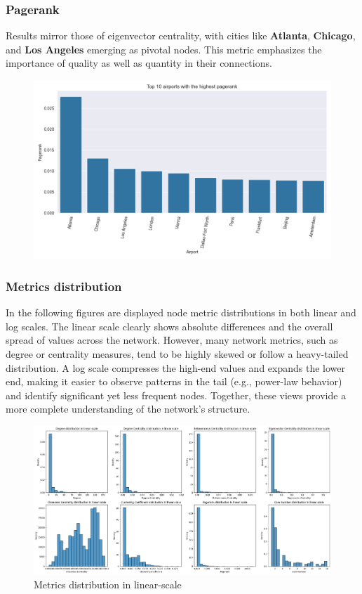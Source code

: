 \documentclass[12pt]{article}
\begin{document}
\subsubsection{Pagerank}
Results mirror those of eigenvector centrality, with cities like \textbf{Atlanta}, \textbf{Chicago}, and \textbf{Los Angeles} emerging as pivotal nodes. This metric emphasizes the importance of quality as well as quantity in their connections.
\begin{figure}[H]
    \centering
    \includegraphics[width=0.8\linewidth]{img/pagerank.png}
\end{figure}

\subsubsection{Metrics distribution}
In the following figures are displayed node metric distributions in both linear and log scales. The linear scale clearly shows absolute differences and the overall spread of values across the network. However, many network metrics, such as degree or centrality measures, tend to be highly skewed or follow a heavy-tailed distribution. A log scale compresses the high-end values and expands the lower end, making it easier to observe patterns in the tail (e.g., power-law behavior) and identify significant yet less frequent nodes. Together, these views provide a more complete understanding of the network's structure.
\begin{figure}[H]
    \centering
    \includegraphics[width=0.8\linewidth]{img/metrics_output.png}
    \caption{Metrics distribution in linear-scale}
\end{figure}
\end{document}
